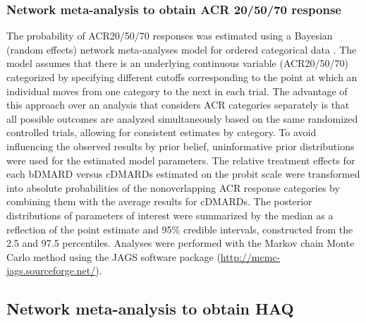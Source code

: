 \documentclass[11pt,final,fleqn]{article}\usepackage[]{graphicx}\usepackage[]{color}
\theoremstyle{plain}
\begin{document}
\begin{appendices}
\subsubsection{Network meta-analysis to obtain ACR 20/50/70
response}\label{network-meta-analysis-to-obtain-acr-205070-response}

The probability of ACR20/50/70 responses was estimated using a Bayesian (random effects) network meta-analyses model for ordered categorical data \citep{dias2013evidence}. The model assumes that there is an underlying continuous variable (ACR20/50/70) categorized by specifying different cutoffs corresponding to the point at which an individual moves from one category to the next in each trial. The advantage of this approach over an analysis that considers ACR categories separately is that all possible outcomes are analyzed simultaneously based on the same randomized controlled trials, allowing for consistent estimates by category. To avoid influencing the observed results by prior belief, uninformative prior distributions were used for the estimated model parameters. The relative treatment effects for each bDMARD versus cDMARDs estimated on the probit scale were transformed into absolute probabilities of the nonoverlapping ACR response categories by combining them with the average results for cDMARDs. The posterior distributions of parameters of interest were summarized by the median as a reflection of the point estimate and 95\% credible intervals, constructed from the 2.5 and 97.5 percentiles. Analyses were performed with the Markov chain Monte Carlo method using the JAGS software package (\url{http://mcmc-jags.sourceforge.net/}).

\subsection{Network meta-analysis to obtain
HAQ}\label{network-meta-analysis-to-obtain-haq}

\end{appendices}


\end{document}
